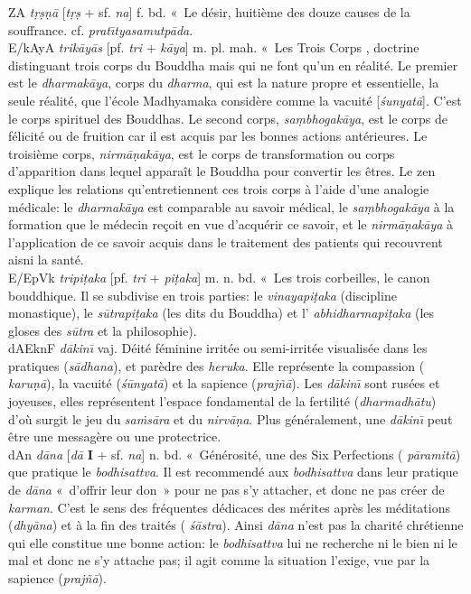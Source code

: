 \documentclass[a4paper,11pt,twocolumn]{article}
\begin{document}
{\dn {}^^IZA} {\em t\d{r}\d{s}\d{n}\={a}} [{\em t\d{r}\d{s}} +
sf. {\em na}] f. bd. «~Le désir\fg, huitième des douze causes de la
souffrance. cf. {\em prat\={\i}tyasamutp\={a}da}. \\

{\dn E/kAyA} {\em trik\={a}y\={a}s} [pf. {\em tri} + {\em k\={a}ya}]
m. pl. mah. «~Les Trois Corps \fg, doctrine distinguant trois corps du
Bouddha mais qui ne font qu'un en réalité. Le premier est le {\em
dharmak\={a}ya}, corps du {\em dharma}, qui est la nature propre et
essentielle, la seule réalité, que l'école Madhyamaka considère comme
la vacuité [{\em \'{s}unyat\={a}}].  C'est le corps spirituel des
Bouddhas. Le second corps, {\em sa\d{m}bhogak\={a}ya}, est le corps de
félicité ou de fruition car il est acquis par les bonnes actions
antérieures. Le troisième corps, {\em nirm\={a}\d{n}ak\={a}ya}, est le
corps de transformation ou corps d'apparition dans lequel apparaît le
Bouddha pour convertir les êtres. Le zen explique les relations
qu'entretiennent ces trois corps à l'aide d'une analogie médicale: le
{\em dharmak\={a}ya} est comparable au savoir médical, le {\em
sa\d{m}bhogak\={a}ya} à la formation que le médecin re\c{c}oit en vue
d'acquérir ce savoir, et le {\em nirm\={a}\d{n}ak\={a}ya} à
l'application de ce savoir acquis dans le traitement des patients qui
recouvrent aisni la santé. \\

{\dn E/EpVk} {\em tripi\d{t}aka} [pf. {\em tri} + {\em
pi\d{t}aka}] m. n. bd. «~Les trois corbeilles\fg, le canon
bouddhique. Il se subdivise en trois parties: le {\em
vinayapi\d{t}aka} (discipline monastique), le {\em
s\={u}trapi\d{t}aka} (les dits du Bouddha) et l'{\em
abhidharmapi\d{t}aka} (les gloses des {\em s\={u}tra} et la
philosophie).\\

{\dn dAEknF} {\em d\={a}kin\={\i}} vaj. Déité féminine irritée ou
semi-irritée visualisée dans les pratiques ({\em s\={a}dhana}),
et parèdre des {\em heruka}. Elle représente la compassion ({\em
karu\d{n}\={a}}), la vacuité ({\em \'{s}\={u}nyat\={a}}) et la
sapience ({\em prajñ\={a}}). Les {\em d\={a}kin\={\i}} sont rusées et
joyeuses, elles représentent l'espace fondamental de la fertilité
({\em dharmadh\={a}tu}) d'où surgit le jeu du {\em sa\.{m}s\={a}ra} et
du {\em nirv\={a}\d{n}a}. Plus généralement, une {\em d\={a}kin\={\i}} peut
être une messagère ou une protectrice. \\

{\dn dAn} {\em d\={a}na} [{\em d\={a}} {\bf I} + sf. {\em na}]
n. bd. «~Générosité\fg, une des Six Perfections ({\em
p\={a}ramit\={a}}) que pratique le {\em bodhisattva}. Il est
recommendé aux {\em bodhisattva} dans leur pratique de {\em d\={a}na}
«~d'offrir leur don~» pour ne pas s'y attacher, et donc ne pas créer
de {\em karman}. C'est le sens des fréquentes dédicaces des mérites
après les méditations ({\em dhy\={a}na}) et à la fin des traités ({\em
\'{s}\={a}stra}). Ainsi {\em d\={a}na} n'est pas la charité chrétienne
qui elle constitue une bonne action: le {\em bodhisattva} lui ne recherche
ni le bien ni le mal et donc ne s'y attache pas; il agit comme la
situation l'exige, vue par la sapience ({\em praj\~{n}\={a}}). \\
\end{document}
